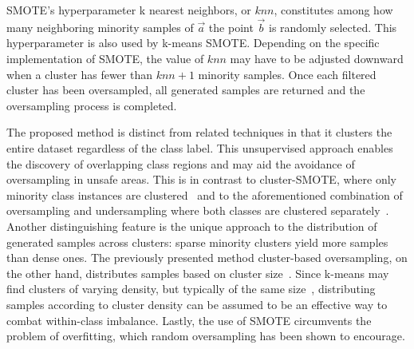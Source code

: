 \documentclass[sort&compress]{elsarticle}
\begin{document}
	\ac{SMOTE}'s hyperparameter k nearest neighbors, or $knn$, constitutes among how many neighboring minority samples of $\vec{a}$ the point $\vec{b}$ is randomly selected. This hyperparameter is also used by k-means \ac{SMOTE}. Depending on the specific implementation of \ac{SMOTE}, the value of $knn$ may have to be adjusted downward when a cluster has fewer than $knn + 1$ minority samples. Once each filtered cluster has been oversampled, all generated samples are returned and the oversampling process is completed.

	The proposed method is distinct from related techniques in that it clusters the entire dataset regardless of the class label. This unsupervised approach enables the discovery of overlapping class regions and may aid the avoidance of oversampling in unsafe areas. This is in contrast to cluster-SMOTE, where only minority class instances are clustered~\citep{Cieslak.2006} and to the aforementioned combination of oversampling and undersampling where both classes are clustered separately~\citep{Song.2016}. Another distinguishing feature is the unique approach to the distribution of generated samples across clusters: sparse minority clusters yield more samples than dense ones. The previously presented method cluster-based oversampling, on the other hand, distributes samples based on cluster size~\citep{Jo.2004}. Since k-means may find clusters of varying density, but typically of the same size~\citep{MacQueen.1967, Wu.2010}, distributing samples according to cluster density can be assumed to be an effective way to combat within-class imbalance. Lastly, the use of \ac{SMOTE} circumvents the problem of overfitting, which random oversampling has been shown to encourage.
	
\end{document}
